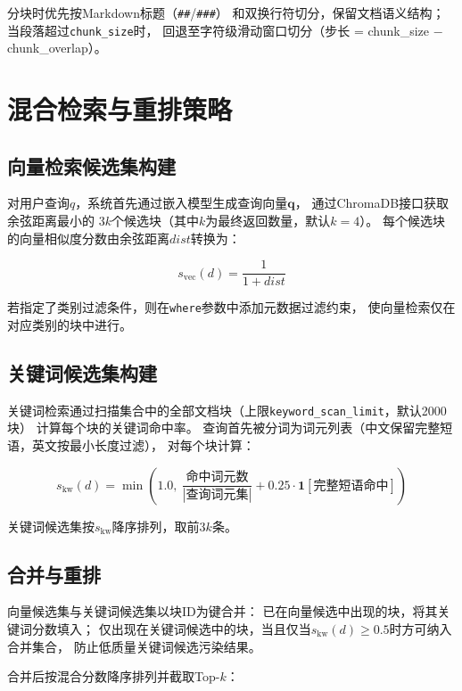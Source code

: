 分块时优先按Markdown标题（\texttt{\#\#}/\texttt{\#\#\#}）
和双换行符切分，保留文档语义结构；
当段落超过\texttt{chunk\_size}时，
回退至字符级滑动窗口切分（步长 = chunk\_size $-$ chunk\_overlap）。

\section{混合检索与重排策略}

\subsection{向量检索候选集构建}

对用户查询$q$，系统首先通过嵌入模型生成查询向量$\boldsymbol{q}$，
通过ChromaDB接口获取余弦距离最小的
$3k$个候选块（其中$k$为最终返回数量，默认$k=4$）。
每个候选块的向量相似度分数由余弦距离$dist$转换为：

\begin{equation}
s_\text{vec}(d) = \frac{1}{1 + dist}
\end{equation}

若指定了类别过滤条件，则在\texttt{where}参数中添加元数据过滤约束，
使向量检索仅在对应类别的块中进行。

\subsection{关键词候选集构建}

关键词检索通过扫描集合中的全部文档块（上限\texttt{keyword\_scan\_limit}，默认2000块）
计算每个块的关键词命中率。
查询首先被分词为词元列表（中文保留完整短语，英文按最小长度过滤），
对每个块计算：

\begin{equation}
s_\text{kw}(d) = \min\left(1.0,\ \frac{\text{命中词元数}}{|\text{查询词元集}|} + 0.25 \cdot \mathbf{1}[\text{完整短语命中}]\right)
\end{equation}

关键词候选集按$s_\text{kw}$降序排列，取前$3k$条。

\subsection{合并与重排}

向量候选集与关键词候选集以块ID为键合并：
已在向量候选中出现的块，将其关键词分数填入；
仅出现在关键词候选中的块，当且仅当$s_\text{kw}(d) \geq 0.5$时方可纳入合并集合，
防止低质量关键词候选污染结果。

合并后按混合分数降序排列并截取Top-$k$：

